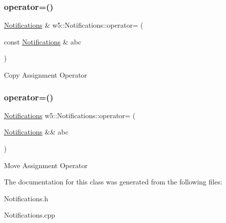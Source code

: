 \subsubsection{\texorpdfstring{operator=()}{operator=()}\hspace{0.1cm}{\footnotesize\ttfamily [1/2]}}
{\footnotesize\ttfamily \mbox{\hyperlink{classw5_1_1_notifications}{Notifications}} \& w5\+::\+Notifications\+::operator= (\begin{DoxyParamCaption}\item[{const \mbox{\hyperlink{classw5_1_1_notifications}{Notifications}} \&}]{abc }\end{DoxyParamCaption})}

Copy Assignment Operator \mbox{\label{classw5_1_1_notifications_ae1c5a19fc8b0eaff1602d28dce92c454}} 
\subsubsection{\texorpdfstring{operator=()}{operator=()}\hspace{0.1cm}{\footnotesize\ttfamily [2/2]}}
{\footnotesize\ttfamily \mbox{\hyperlink{classw5_1_1_notifications}{Notifications}} w5\+::\+Notifications\+::operator= (\begin{DoxyParamCaption}\item[{\mbox{\hyperlink{classw5_1_1_notifications}{Notifications}} \&\&}]{abc }\end{DoxyParamCaption})}

Move Assignment Operator 

The documentation for this class was generated from the following files\+:\begin{DoxyCompactItemize}
\item 
Notifications.\+h\item 
Notifications.\+cpp\end{DoxyCompactItemize}
